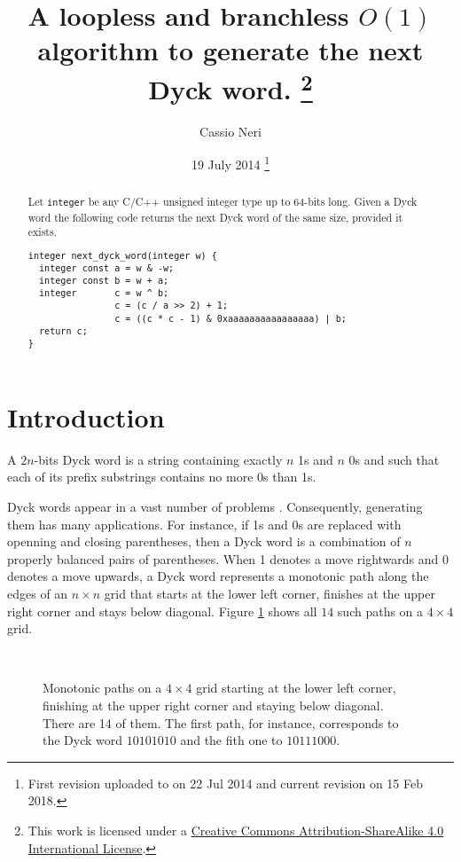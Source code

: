 \documentclass[a4paper]{article}
\title{A loopless and branchless $O(1)$ algorithm to generate the next Dyck word.%
\footnote{%
  This work is licensed under a
  \href{http://creativecommons.org/licenses/by-sa/4.0/}
  {Creative Commons Attribution-ShareAlike 4.0 International License}.
}}
\author{Cassio Neri \\}
\date{19 July 2014%
  \footnote{First revision uploaded to \cite{Neri} on 22 Jul 2014 and current revision on 15 Feb 2018.}
}
\begin{document}
\maketitle

\begin{abstract}

Let \verb!integer! be any C/C++ unsigned integer type up to $64$-bits long.
Given a Dyck word the following code returns the next Dyck word of the same size, provided it exists.
\\
\begin{lstlisting}[caption={Bitwise tricks to generate a Dyck word.},label=bitwise]
integer next_dyck_word(integer w) {
  integer const a = w & -w;
  integer const b = w + a;
  integer       c = w ^ b;
                c = (c / a >> 2) + 1;
                c = ((c * c - 1) & 0xaaaaaaaaaaaaaaaa) | b;
  return c;
}
\end{lstlisting}
\end{abstract}



\section{Introduction}

A $2n$-bits Dyck word is a string containing exactly $n$ 1s and $n$ 0s and such that each of its prefix substrings contains no more 0s than 1s.

Dyck words appear in a vast number of problems \cite{Wikipedia-Catalan}.
Consequently, generating them has many applications.
For instance, if 1s and 0s are replaced with openning and closing parentheses, then a Dyck word is a combination of $n$ properly balanced pairs of parentheses.
When 1 denotes a move rightwards and 0 denotes a move upwards, a Dyck word represents a monotonic path along the edges of an $n\times n$ grid that starts at the lower left corner, finishes at the upper right corner and stays below diagonal.
Figure \ref{fig:Paths-4x4} shows all $14$ such paths on a $4\times 4$ grid.
%
\begin{figure}[ht]
  \def\svgwidth{\textwidth}
  
  \hfill\
  \caption{Monotonic paths on a $4\times 4$ grid starting at the lower left corner, finishing at the upper right corner and staying below diagonal.
  There are 14 of them.
  The first path, for instance, corresponds to the Dyck word $10101010$ and the fith one to $10111000$.}
  \label{fig:Paths-4x4}
\end{figure}
\end{document}
